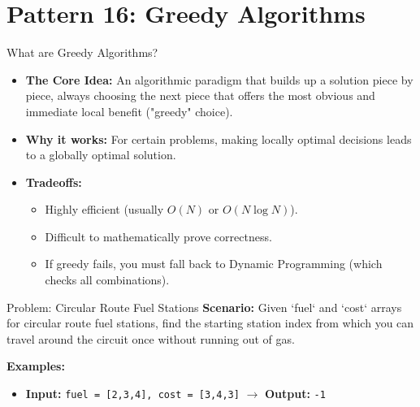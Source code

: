 \section{Pattern 16: Greedy Algorithms}

\begin{frame}[c]{\empty}
    \begin{center}
        \Large\textbf{\secname}
    \end{center}
\end{frame}

\begin{frame}{What are Greedy Algorithms?}
  \begin{itemize}
    \item \textbf{The Core Idea:} An algorithmic paradigm that builds up a solution piece by piece, always choosing the next piece that offers the most obvious and immediate local benefit ("greedy" choice).
    \item \textbf{Why it works:} For certain problems, making locally optimal decisions leads to a globally optimal solution.
    \item \textbf{Tradeoffs:}
      \begin{itemize}
        \item Highly efficient (usually $O(N)$ or $O(N \log N)$).
        \item Difficult to mathematically prove correctness.
        \item If greedy fails, you must fall back to Dynamic Programming (which checks all combinations).
      \end{itemize}
  \end{itemize}
\end{frame}

\begin{frame}[fragile]{Problem: Circular Route Fuel Stations}
  \textbf{Scenario:}
  Given `fuel` and `cost` arrays for circular route fuel stations, find the starting station index from which you can travel around the circuit once without running out of gas.
  
  \vspace{0.3cm}
  \textbf{Examples:}
  \begin{itemize}
    \item \textbf{Input:} \texttt{fuel = [2,3,4], cost = [3,4,3]} $\rightarrow$ \textbf{Output:} \texttt{-1}
  \end{itemize}
\end{frame}

